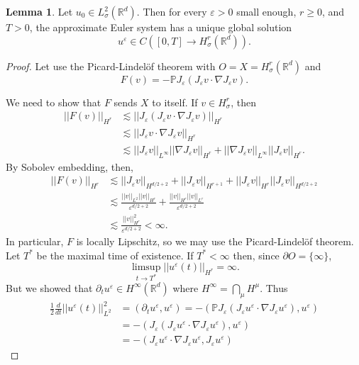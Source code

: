 \documentclass[12pt]{book}
\newcommand{\RR}{\mathbb{R}}
\newcommand{\PP}{\mathbb{P}}
\theoremstyle{definition}
\newtheorem{lemma}[theorem]{Lemma}
\begin{document}
\begin{lemma}
Let $u_0 \in L^2_\sigma(\RR^d)$.
Then for every $\varepsilon > 0$ small enough, $r \geq 0$, and $T > 0$, the approximate Euler system has a unique global solution
$$u^\varepsilon \in C([0, T] \to H^r_\sigma(\RR^d)).$$
\end{lemma}
\begin{proof}
Let use the Picard-Lindel\"of theorem with $O = X = H^r_\sigma(\RR^d)$ and
$$F(v) = -\PP J_\varepsilon(J_\varepsilon v \cdot \nabla J_\varepsilon v).$$

We need to show that $F$ sends $X$ to itself. If $v \in H^r_\sigma$, then
\begin{align*}
||F(v)||_{H^r} &\lesssim ||J_\varepsilon(J_\varepsilon v \cdot \nabla J_\varepsilon v)||_{H^r}\\
&\lesssim ||J_\varepsilon v \cdot \nabla J_\varepsilon v||_{H^r}\\
&\lesssim ||J_\varepsilon v||_{L^\infty} ||\nabla J_\varepsilon v||_{H^r} + ||\nabla J_\varepsilon v||_{L^\infty} ||J_\varepsilon v||_{H^r}.
\end{align*}
By Sobolev embedding, then,
\begin{align*}
||F(v)||_{H^r} &\lesssim ||J_\varepsilon v||_{H^{d/2 + 2}} + ||J_\varepsilon v||_{H^{r+1}} + ||J_\varepsilon v||_{H^r} ||J_\varepsilon v||_{H^{d/2 + 2}}\\
&\lesssim \frac{||v||_{L^2} ||v||_{H^r}}{\varepsilon^{d/2+2}}  + \frac{||v||_{H^r} ||v||_{L^r}}{\varepsilon^{d/2+2}}\\
&\lesssim \frac{||v||_{H^r}^2}{\varepsilon^{d/2+2}} < \infty.
\end{align*}
In particular, $F$ is locally Lipschitz, so we may use the Picard-Lindel\"of theorem.
Let $T^*$ be the maximal time of existence.
If $T^* < \infty$ then, since $\partial O = \{\infty\}$,
$$\limsup_{t \to T^*} ||u^\varepsilon(t)||_{H^r} = \infty.$$
But we showed that $\partial_t u^\varepsilon \in H^\infty(\RR^d)$ where $H^\infty = \bigcap_\mu H^\mu$.
Thus
\begin{align*}
\frac{1}{2} \frac{d}{dt} ||u^\varepsilon(t)||_{L^2}^2 &= (\partial_t u^\varepsilon, u^\varepsilon) = -(\PP J_\varepsilon(J_\varepsilon u^\varepsilon \cdot \nabla J_\varepsilon u^\varepsilon), u^\varepsilon)\\
&= -(J_\varepsilon(J_\varepsilon u^\varepsilon \cdot \nabla J_\varepsilon u^\varepsilon), u^\varepsilon)\\
&= -(J_\varepsilon u^\varepsilon \cdot \nabla J_\varepsilon u^\varepsilon, J_\varepsilon u^\varepsilon)

\end{align*}
\end{proof}
\end{document}
